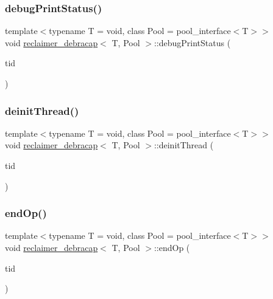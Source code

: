 \subsubsection{\texorpdfstring{debug\+Print\+Status()}{debugPrintStatus()}}
{\footnotesize\ttfamily template$<$typename T  = void, class Pool  = pool\+\_\+interface$<$\+T$>$$>$ \\
void \hyperlink{classreclaimer__debracap}{reclaimer\+\_\+debracap}$<$ T, Pool $>$\+::debug\+Print\+Status (\begin{DoxyParamCaption}\item[{const int}]{tid }\end{DoxyParamCaption})\hspace{0.3cm}{\ttfamily [inline]}}

\mbox{\label{classreclaimer__debracap_a8b73562e6d000dd9445a08891d3a56ec}} 
\subsubsection{\texorpdfstring{deinit\+Thread()}{deinitThread()}}
{\footnotesize\ttfamily template$<$typename T  = void, class Pool  = pool\+\_\+interface$<$\+T$>$$>$ \\
void \hyperlink{classreclaimer__debracap}{reclaimer\+\_\+debracap}$<$ T, Pool $>$\+::deinit\+Thread (\begin{DoxyParamCaption}\item[{const int}]{tid }\end{DoxyParamCaption})\hspace{0.3cm}{\ttfamily [inline]}}

\mbox{\label{classreclaimer__debracap_af290e3cb806e6b4a7325defc2311ad62}} 
\subsubsection{\texorpdfstring{end\+Op()}{endOp()}}
{\footnotesize\ttfamily template$<$typename T  = void, class Pool  = pool\+\_\+interface$<$\+T$>$$>$ \\
void \hyperlink{classreclaimer__debracap}{reclaimer\+\_\+debracap}$<$ T, Pool $>$\+::end\+Op (\begin{DoxyParamCaption}\item[{const int}]{tid }\end{DoxyParamCaption})\hspace{0.3cm}{\ttfamily [inline]}}

